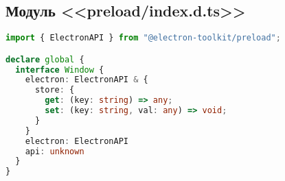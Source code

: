 \subsection{Модуль <<preload/index.d.ts>>}
\begin{lstlisting}[language=typescript]
import { ElectronAPI } from "@electron-toolkit/preload";

declare global {
  interface Window {
    electron: ElectronAPI & {
      store: {
        get: (key: string) => any;
        set: (key: string, val: any) => void;
      }
    }
    electron: ElectronAPI
    api: unknown
  }
}  
\end{lstlisting}
